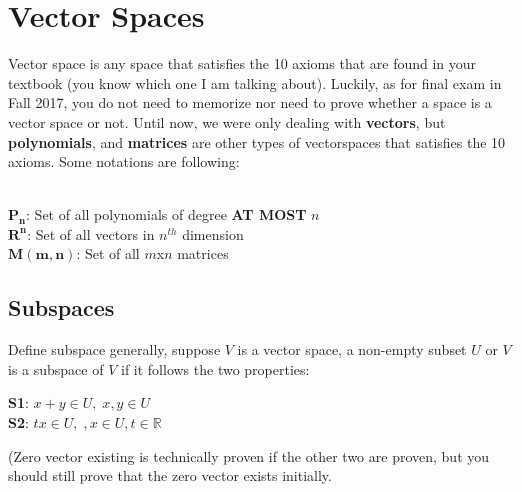 \documentclass[12pt]{article}
\newcommand{\R}{\mathbb{R}}
\begin{document}
\section{Vector Spaces}
Vector space is any space that satisfies the 10 axioms that are found in your textbook (you know which one I am talking about). Luckily, as for final exam in Fall 2017, you do not need to memorize nor need to prove whether a space is a vector space or not. 
Until now, we were only dealing with \textbf{vectors}, but \textbf{polynomials}, and \textbf{matrices} are other types of vectorspaces that satisfies the 10 axioms. Some notations are following: \\\\
\begin{centering}
$\mathbf{P_n}$: Set of all polynomials of degree \textbf{AT MOST} $n$\\
$\mathbf{R^n}$: Set of all vectors in $n^{th}$ dimension\\
$\mathbf{M(m,n)}$: Set of all $m$x$n$ matrices \\
\end{centering}

\subsection{Subspaces}
Define subspace generally, suppose $V$ is a vector space, a non-empty subset  $U$ or $V$ is a subspace of $V$ if it follows the two properties:\\
\begin{centering}
\textbf{S1}: $x + y \in U, \; x,y \in U$\\
\textbf{S2}: $tx \in U, \;, x\in U, t\in\R$\\ 
\end{centering}
(Zero vector existing is technically proven if the other two are proven, but you should still prove that the zero vector exists initially.
\end{document}
